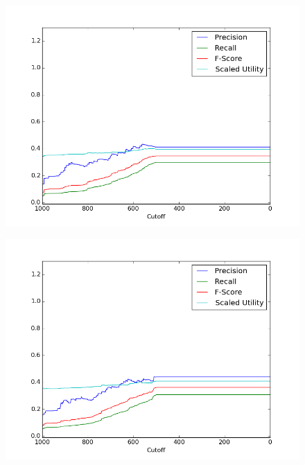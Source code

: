 \documentclass{article}
\begin{document}
{{\begin{figure}[h!]
\begin{minipage}{.25\textwidth}
  \includegraphics[width=1\linewidth]{fig/official/f_mean_stat.png}
  \label{fig:mean_stat}
\end{minipage}%
\begin{minipage}{.25\textwidth}
  \centering
  \includegraphics[width=1\linewidth]{fig/official/f_mean_dyn.png}
  \label{fig:mean_dyn}
\end{minipage}
\begin{minipage}{.25\textwidth}
  \centering

\end{minipage}
\end{figure}}}
\end{document}
